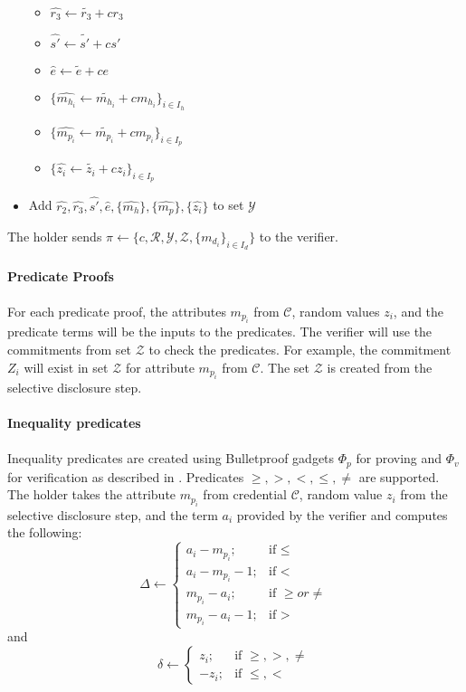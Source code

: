 \documentclass[a4paper]{article}
\begin{document}
\begin{itemize}
\begin{itemize}
        \item $\widehat{r_3} \leftarrow \widetilde{r_3} + c r_3$
        \item $\widehat{s'} \leftarrow \widetilde{s'} + c s'$
        \item $\widehat{e} \leftarrow \widetilde{e} + c e$
        \item $\{\widehat{m_{h_i}} \leftarrow \widetilde{m_{h_i}} + c m_{h_i}\}_{i \in I_h}$
        \item $\{\widehat{m_{p_i}} \leftarrow \widetilde{m_{p_i}} + c m_{p_i}\}_{i \in I_p}$
        \item $\{\widehat{z_i} \leftarrow \widetilde{z_i} + cz_i\}_{i \in I_p}$
        \end{itemize}
    \item Add $\widehat{r_2},\widehat{r_3},\widehat{s'},\widehat{e},\{\widehat{m_h}\},\{\widehat{m_p}\},\{\widehat{z_i}\}$ to set $\mathcal{Y}$
\end{itemize}
The holder sends $\pi \leftarrow \{c, \mathcal{R}, \mathcal{Y}, \mathcal{Z}, \{m_{d_i}\}_{i \in I_d}\}$ to the verifier.\\\\
\textbf{Predicate Proofs}\\\\
For each predicate proof, the attributes $m_{p_i}$  from $\mathcal{C}$, random values $z_i$, and the predicate terms will be the inputs to the predicates. The verifier will  use the commitments from set $\mathcal{Z}$ to check the predicates. For example, the commitment $Z_i$ will exist in set $\mathcal{Z}$ for attribute $m_{p_i}$ from $\mathcal{C}$. The set $\mathcal{Z}$ is created from the selective disclosure step.\\\\
\textbf{Inequality predicates}\\\\
Inequality predicates are created using Bulletproof gadgets $\Phi_p$ for proving and $\Phi_v$ for verification as described in \cite{BBBPWM18}. Predicates $\geq,  >, <, \leq, \neq$ are supported. The holder takes the attribute $m_{p_i}$ from credential $\mathcal{C}$, random value $z_i$ from the selective disclosure step, and the term $a_i$ provided by the verifier and computes the following:
$$
\Delta \leftarrow \begin{cases}
a_i-m_{p_i}; & \mbox{if } \leq\\
a_i-m_{p_i}-1; & \mbox{if }  <\\
m_{p_i}-a_i; & \mbox{if } \geq or \neq\\
m_{p_i}-a_i-1; & \mbox{if } >
\end{cases}
$$
and 
$$
\delta \leftarrow \begin{cases}
z_i; &\mbox{if } \geq, >, \neq\\
-z_i; &\mbox{if } \leq, <
\end{cases}
$$
\end{document}
